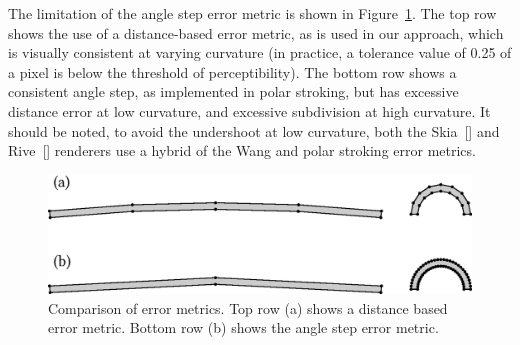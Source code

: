 \documentclass[sigconf, nonacm]{acmart}
\begin{document}
The limitation of the angle step error metric is shown in Figure~\ref{fig:angle_err}. The top row shows the use of a distance-based error metric, as is used in our approach, which is visually consistent at varying curvature (in practice, a tolerance value of 0.25 of a pixel is below the threshold of perceptibility). The bottom row shows a consistent angle step, as implemented in polar stroking, but has excessive distance error at low curvature, and excessive subdivision at high curvature. It should be noted, to avoid the undershoot at low curvature, both the Skia~[] and Rive~[] renderers use a hybrid of the Wang and polar stroking error metrics.

\begin{figure}
    \includegraphics[scale=0.5]{angle_err}
    \caption{Comparison of error metrics. Top row (a) shows a distance based error metric. Bottom row (b) shows the angle step error metric.}
    \label{fig:angle_err}
\end{figure}

%
%
\end{document}
